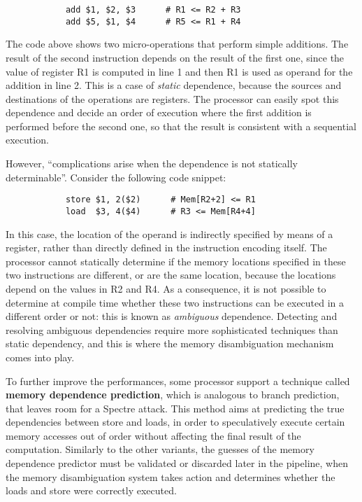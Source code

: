 \documentclass[target=mst,aauheader=aics]{thud}
\theoremstyle{definition}
\begin{document}
	\vspace{3mm}
	\begin{minipage}{.5\textwidth}
		\begin{lstlisting}
			add $1, $2, $3      # R1 <= R2 + R3
			add $5, $1, $4      # R5 <= R1 + R4
		\end{lstlisting}
	\end{minipage}
	
	The code above shows two micro-operations that perform simple additions. The result of the second instruction depends on the result of the first one, since the value of register R1 is computed in line 1 and then R1 is used as operand for the addition in line 2. This is a case of \textit{static} dependence, because the sources and destinations of the operations are registers. The processor can easily spot this dependence and decide an order of execution where the first addition is performed before the second one, so that the result is consistent with a sequential execution.
	
	However, ``complications arise when the dependence is not statically determinable''. Consider the following code snippet:
	
	\vspace{3mm}
	\begin{minipage}{.5\textwidth}
		\begin{lstlisting}
			store $1, 2($2)      # Mem[R2+2] <= R1
			load  $3, 4($4)      # R3 <= Mem[R4+4]
		\end{lstlisting}
	\end{minipage}
	
	In this case, the location of the operand is indirectly specified by means of a register, rather than directly defined in the instruction encoding itself. The processor cannot statically determine if the memory locations specified in these two instructions are different, or are the same location, because the locations depend on the values in R2 and R4. As a consequence, it is not possible to determine at compile time whether these two instructions can be executed in a different order or not: this is known as \textit{ambiguous} dependence. Detecting and resolving ambiguous dependencies require more sophisticated techniques than static dependency, and this is where the memory disambiguation mechanism comes into play.
	
	To further improve the performances, some processor support a technique called \textbf{memory dependence prediction}, which is analogous to branch prediction, that leaves room for a Spectre attack. This method aims at predicting the true dependencies between store and loads, in order to speculatively execute certain memory accesses out of order without affecting the final result of the computation. Similarly to the other variants, the guesses of the memory dependence predictor must be validated or discarded later in the pipeline, when the memory disambiguation system takes action and determines whether the loads and store were correctly executed.
\end{document}
